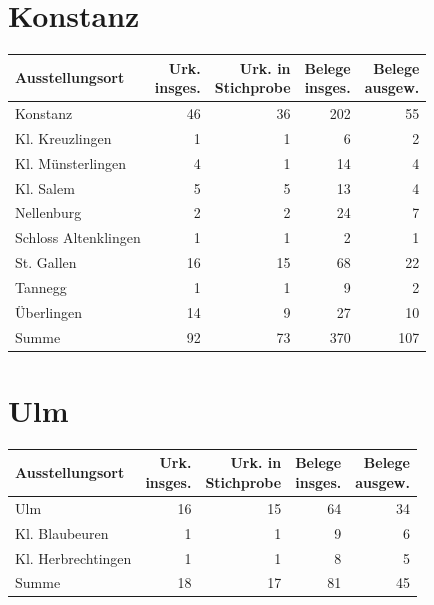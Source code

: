 \section{Konstanz}

\begin{tabularx}{\linewidth}{X r r r r}
\toprule
Ausstellungsort
	& \makecell{Urk.\\ insges.}
	& \makecell{Urk. in\\ Stichprobe}
	& \makecell{Belege\\ insges.}
	& \makecell{Belege\\ ausgew.}
	\\
\midrule

Konstanz
	& 46
	& 36
	& 202
	& 55
	\\

Kl. Kreuzlingen
	& 1
	& 1
	& 6
	& 2
	\\

Kl. Münsterlingen
	& 4
	& 1
	& 14
	& 4
	\\

Kl. Salem
	& 5
	& 5
	& 13
	& 4
	\\

Nellenburg
	& 2
	& 2
	& 24
	& 7
	\\

Schloss Altenklingen
	& 1
	& 1
	& 2
	& 1
	\\

St. Gallen
	& 16
	& 15
	& 68
	& 22
	\\

Tannegg
	& 1
	& 1
	& 9
	& 2
	\\

Überlingen
	& 14
	& 9
	& 27
	& 10
	\\

\midrule

Summe
	& 92
	& 73
	& 370
	& 107
	\\

\bottomrule
\end{tabularx}

\section{Ulm}

\begin{tabularx}{\linewidth}{X r r r r}
\toprule
Ausstellungsort
	& \makecell{Urk.\\ insges.}
	& \makecell{Urk. in\\ Stichprobe}
	& \makecell{Belege\\ insges.}
	& \makecell{Belege\\ ausgew.}
	\\
\midrule

Ulm
	& 16
	& 15
	& 64
	& 34
	\\

Kl. Blaubeuren
	& 1
	& 1
	& 9
	& 6
	\\

Kl. Herbrechtingen
	& 1
	& 1
	& 8
	& 5
	\\

\midrule

Summe
	& 18
	& 17
	& 81
	& 45
	\\

\bottomrule
\end{tabularx}

